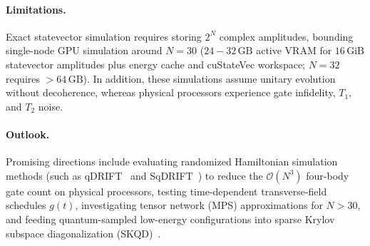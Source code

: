 \documentclass[10pt,twocolumn,a4paper]{article}
\begin{document}
\paragraph{Limitations.}
Exact statevector simulation requires storing $2^N$ complex amplitudes, bounding single-node GPU simulation around $N = 30$ ($24-32\,\text{GB}$ active VRAM for $16\,\text{GiB}$ statevector amplitudes plus energy cache and cuStateVec workspace; $N = 32$ requires $>64\,\text{GB}$). In addition, these simulations assume unitary evolution without decoherence, whereas physical processors experience gate infidelity, $T_1$, and $T_2$ noise.

\paragraph{Outlook.}
Promising directions include evaluating randomized Hamiltonian simulation methods (such as qDRIFT~\cite{campbell2019} and SqDRIFT~\cite{piccinelli2025}) to reduce the $\mathcal{O}(N^3)$ four-body gate count on physical processors, testing time-dependent transverse-field schedules $g(t)$, investigating tensor network (MPS) approximations for $N > 30$, and feeding quantum-sampled low-energy configurations into sparse Krylov subspace diagonalization (SKQD)~\cite{yu2025}.
\end{document}
